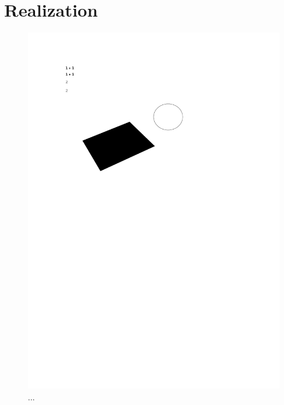 \documentclass[../Paper.tex]{subfiles}
\begin{document}
\section{Realization}





\begin{figure}[H]
\centering
\includegraphics[width=12cm]{../Figures/1.pdf}
\caption{...}
\label{fig1}
\end{figure}
\end{document}
